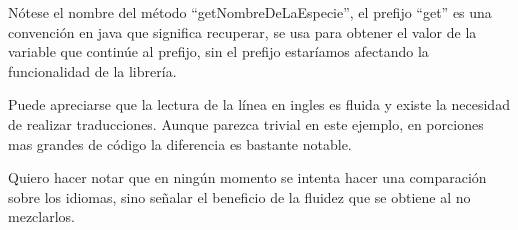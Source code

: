 	Nótese el nombre del método ``getNombreDeLaEspecie'', el prefijo ``get'' es una convención en java que significa recuperar, se usa para obtener el valor de la variable que continúe al prefijo, sin el prefijo estaríamos afectando la funcionalidad de la librería.

	Puede apreciarse que la lectura de la línea en ingles es fluida y existe la necesidad de realizar traducciones. Aunque parezca trivial en este ejemplo, en porciones mas grandes de código la diferencia es bastante notable.

	Quiero hacer notar que en ningún momento se intenta hacer una comparación sobre los idiomas, sino señalar el beneficio de la fluidez que se obtiene al no mezclarlos.

	

	